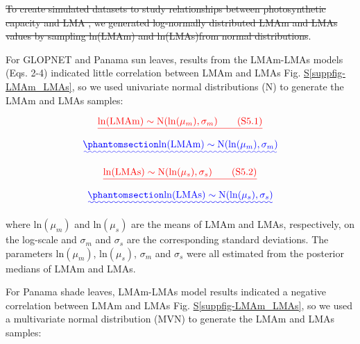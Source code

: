 \documentclass[
  12pt,
  letterpaper,
  DIV=11,
  numbers=noendperiod]{scrartcl}
\numberwithin{equation}{section} %
\newcommand*\quartosuppfigref[1]{Fig. \hyperref[#1]{S\ref{#1}}}
\providecommand{\DIFadd}[1]{{\protect\color{blue}\uwave{#1}}} %
\providecommand{\DIFdel}[1]{{\protect\color{red}\sout{#1}}}                      %
\providecommand{\DIFaddbegin}{} %
\providecommand{\DIFaddend}{} %
\providecommand{\DIFdelbegin}{} %
\providecommand{\DIFdelend}{} %
\newcommand{\DIFscaledelfig}{0.5}
\newlength{\DIFdelgraphicswidth} %
\newlength{\DIFdelgraphicsheight} %
\newcommand{\DIFaddincludegraphics}[2][]{{\color{blue}\fbox{\DIFOincludegraphics[#1]{#2}}}} %
\newcommand{\DIFdelincludegraphics}[2][]{%
\sbox{\DIFdelgraphicsbox}{\DIFOincludegraphics[#1]{#2}}%
\settoboxwidth{\DIFdelgraphicswidth}{\DIFdelgraphicsbox} %
\settoboxtotalheight{\DIFdelgraphicsheight}{\DIFdelgraphicsbox} %
\scalebox{\DIFscaledelfig}{%
\parbox[b]{\DIFdelgraphicswidth}{\usebox{\DIFdelgraphicsbox}\\[-\baselineskip] \rule{\DIFdelgraphicswidth}{0em}}\llap{\resizebox{\DIFdelgraphicswidth}{\DIFdelgraphicsheight}{%
\setlength{\unitlength}{\DIFdelgraphicswidth}%
\begin{picture}(1,1)%
\thicklines\linethickness{2pt} %
{\color[rgb]{1,0,0}\put(0,0){\framebox(1,1){}}}%
{\color[rgb]{1,0,0}\put(0,0){\line( 1,1){1}}}%
{\color[rgb]{1,0,0}\put(0,1){\line(1,-1){1}}}%
\end{picture}%
}\hspace*{3pt}}} %
} %
\DeclareRobustCommand{\DIFaddbegin}{\DIFOaddbegin \let\includegraphics\DIFaddincludegraphics} %
\DeclareRobustCommand{\DIFaddend}{\DIFOaddend \let\includegraphics\DIFOincludegraphics} %
\DeclareRobustCommand{\DIFdelbegin}{\DIFOdelbegin \let\includegraphics\DIFdelincludegraphics} %
\DeclareRobustCommand{\DIFdelend}{\DIFOaddend \let\includegraphics\DIFOincludegraphics} %
\begin{document}
\DIFdel{To create simulated datasets to study relationships between
photosynthetic capacity and LMA , we generated log-normally distributed
LMAm and LMAs values by sampling ln(LMAm) and ln(LMAs)from normal
distributions}\DIFdelend \DIFaddbegin \DIFadd{\mbox{%
\citeproc{ref-Osnas2018}{Osnas et al. 2018}}\hspace{0pt}%
)}\DIFaddend .

For GLOPNET and Panama sun leaves, results from the LMAm-LMAs models
(Eqs. 2-4) indicated little correlation between LMAm and LMAs
\DIFaddbegin \DIFadd{(}\quartosuppfigref{suppfig-LMAm_LMAs}\DIFadd{a)}\DIFaddend , so we used univariate normal
distributions (N) to generate the LMAm and LMAs samples:

\DIFdelbegin \[
\DIFdel{\mathrm{ln}(\mathrm{LMAm}) \sim \mathrm{N}(\mathrm{ln}(\mu_m), \sigma_m) \qquad(\mathrm{S}5.1)
}\]%
\DIFdelend \DIFaddbegin \begin{equation}\DIFadd{\phantomsection\label{eq-sim_LMAm}{
\mathrm{ln}(\mathrm{LMAm}) \sim \mathrm{N}(\mathrm{ln}(\mu_m), \sigma_m)
}}\end{equation}\DIFaddend 

\DIFdelbegin \[
\DIFdel{\mathrm{ln}(\mathrm{LMAs}) \sim \mathrm{N}(\mathrm{ln}(\mu_s), \sigma_s) \qquad(\mathrm{S}5.2)
}\]%
\DIFdelend \DIFaddbegin \begin{equation}\DIFadd{\phantomsection\label{eq-sim_LMAs}{
\mathrm{ln}(\mathrm{LMAs}) \sim \mathrm{N}(\mathrm{ln}(\mu_s), \sigma_s)
}}\end{equation}\DIFaddend 

where \(\mathrm{ln}(\mu_m)\) and \(\mathrm{ln}(\mu_s)\) are the means of
LMAm and LMAs, respectively, on the log-scale and \(\sigma_m\) and
\(\sigma_s\) are the corresponding standard deviations. The parameters
\(\mathrm{ln}(\mu_m)\), \(\mathrm{ln}(\mu_s)\), \(\sigma_m\) and
\(\sigma_s\) were all estimated from the posterior medians of LMAm and
LMAs.

For Panama shade leaves, LMAm-LMAs model results indicated a negative
correlation between LMAm and LMAs
\DIFaddbegin \DIFadd{(}\quartosuppfigref{suppfig-LMAm_LMAs}\DIFadd{b)}\DIFaddend , so we used a multivariate
normal distribution (MVN) to generate the LMAm and LMAs samples:
\end{document}
